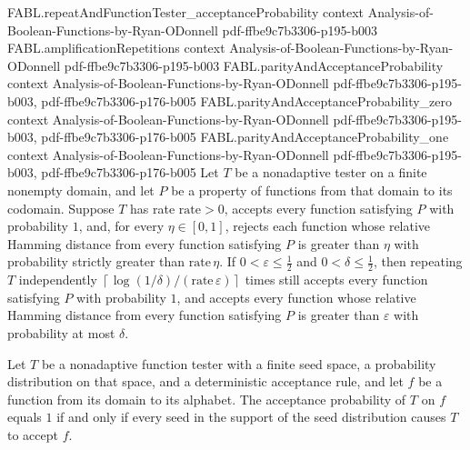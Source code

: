 \begin{theorem}
\proofstep
  {FABL.repeatAndFunctionTester_acceptanceProbability}
  {context}
  {Analysis-of-Boolean-Functions-by-Ryan-ODonnell}
  {pdf-ffbe9c7b3306-p195-b003}
\proofstep
  {FABL.amplificationRepetitions}
  {context}
  {Analysis-of-Boolean-Functions-by-Ryan-ODonnell}
  {pdf-ffbe9c7b3306-p195-b003}
\proofstep
  {FABL.parityAndAcceptanceProbability}
  {context}
  {Analysis-of-Boolean-Functions-by-Ryan-ODonnell}
  {pdf-ffbe9c7b3306-p195-b003,
    pdf-ffbe9c7b3306-p176-b005}
\proofstep
  {FABL.parityAndAcceptanceProbability_zero}
  {context}
  {Analysis-of-Boolean-Functions-by-Ryan-ODonnell}
  {pdf-ffbe9c7b3306-p195-b003,
    pdf-ffbe9c7b3306-p176-b005}
\proofstep
  {FABL.parityAndAcceptanceProbability_one}
  {context}
  {Analysis-of-Boolean-Functions-by-Ryan-ODonnell}
  {pdf-ffbe9c7b3306-p195-b003,
    pdf-ffbe9c7b3306-p176-b005}
Let $T$ be a nonadaptive tester on a finite nonempty domain, and let $P$ be a property
of functions from that domain to its codomain. Suppose $T$ has rate $\mathrm{rate}>0$,
accepts every function satisfying $P$ with probability $1$, and, for every
$\eta\in[0,1]$, rejects each function whose relative Hamming distance from every
function satisfying $P$ is greater than $\eta$ with probability strictly greater than
$\mathrm{rate}\,\eta$. If $0<\varepsilon\leq\tfrac12$ and $0<\delta\leq\tfrac12$, then
repeating $T$ independently
$\left\lceil\log(1/\delta)/(\mathrm{rate}\,\varepsilon)\right\rceil$ times still accepts
every function satisfying $P$ with probability $1$, and accepts every function whose
relative Hamming distance from every function satisfying $P$ is greater than
$\varepsilon$ with probability at most $\delta$.
\end{theorem}

\begin{theorem}
\label{FABL.acceptanceProbability_eq_one_iff_support_amplification}
\leanok
{}
Let $T$ be a nonadaptive function tester with a finite seed space, a probability
distribution on that space, and a deterministic acceptance rule, and let $f$ be a
function from its domain to its alphabet. The acceptance probability of $T$ on $f$
equals $1$ if and only if every seed in the support of the seed distribution causes $T$
to accept $f$.
\end{theorem}

